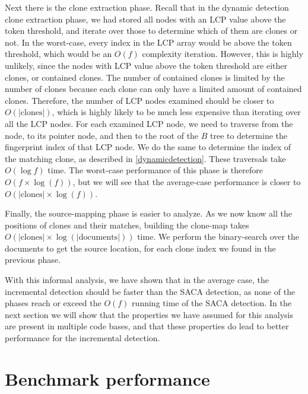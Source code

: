 
Next there is the clone extraction phase. Recall that in the dynamic detection clone
extraction phase, we had stored all nodes with an LCP value above the token threshold, and
iterate over those to determine which of them are clones or not. In the worst-case, every
index in the LCP array would be above the token threshold, which would be an $O(f)$
complexity iteration. However, this is highly unlikely, since the nodes with LCP value
above the token threshold are either clones, or contained clones. The number of contained
clones is limited by the number of clones because each clone can only have a limited
amount of contained clones. Therefore, the number of LCP nodes examined should be closer
to $O(\vert\text{clones}\vert)$, which is highly likely to be much less expensive than
iterating over all the LCP nodes. For each examined LCP node, we need to traverse from the
node, to its pointer node, and then to the root of the $B$ tree to determine the
fingerprint index of that LCP node. We do the same to determine the index of the matching
clone, as described in \cref{dynamicdetection}. These traversals take $O(\log f)$ time.
The worst-case performance of this phase is therefore $O(f \times \log(f))$, but we will
see that the average-case performance is closer to $O(\vert\text{clones}\vert \times
\log(f))$.

Finally, the source-mapping phase is easier to analyze. As we now know all the positions
of clones and their matches, building the clone-map takes $O(\vert\text{clones}\vert
\times \log(\vert\text{documents}\vert))$ time. We perform the binary-search over the
documents to get the source location, for each clone index we found in the previous phase.

With this informal analysis, we have shown that in the average case, the incremental
detection should be faster than the SACA detection, as none of the phases reach or exceed
the $O(f)$ running time of the SACA detection. In the next section we will show that the
properties we have assumed for this analysis are present in multiple code bases, and that
these properties do lead to better performance for the incremental detection.


\section{Benchmark performance}

